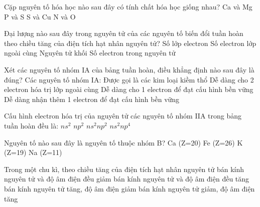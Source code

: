 \documentclass[Main_HOA10.tex]{subfiles}
\begin{document}
\begin{ex}%
	Cặp nguyên tố hóa học nào sau đây có tính chất hóa học giống nhau?
	\choice
	{\True Ca và Mg}
	{P và S}
	{S và Cu}
	{N và O}
\end{ex}
\begin{ex}%
	Đại lượng nào sau đây trong nguyên tử của các nguyên tố biến đổi tuần hoàn theo chiều tăng của điện tích hạt nhân nguyên tử?
	\choice
	{Số lớp electron}
	{\True Số electron lớp ngoài cùng}
	{Nguyên tử khối}
	{Số electron trong nguyên tử}
\end{ex}
\begin{ex}%
	Xét các nguyên tố nhóm IA của bảng tuần hoàn, điều khẳng định nào sau đây là đúng?
	Các nguyên tố nhóm IA:
	\choice
	{Được gọi là các kim loại kiềm thổ}
	{Dễ dàng cho 2 electron hóa trị lớp ngoài cùng}
	{\True Dễ dàng cho 1 electron để đạt cấu hình bền vững}
	{Dễ dàng nhận thêm 1 electron để đạt cấu hình bền vững}
\end{ex}
\begin{ex}%
	Cấu hình electron hóa trị của nguyên tử các nguyên tố nhóm IIA trong bảng tuần hoàn đều là:
	\choice
	{\True $ns^2$}
	{$np^2$}
	{$ns^2np^2$}
	{$ns^2np^4$}
\end{ex}
\begin{ex}%
	Nguyên tố nào sau đây là nguyên tố thuộc nhóm B?
	\choice
	{Ca (Z=20)}
	{\True Fe (Z=26)}
	{K (Z=19)}
	{Na (Z=11)}
\end{ex}
\begin{ex}%
	Trong một chu kì, theo chiều tăng của điện tích hạt nhân nguyên tử
	\choice
	{bán kính nguyên tử và độ âm điện đều giảm}
	{bán kính nguyên tử và độ âm điện đều tăng}
	{bán kính nguyên tử tăng, độ âm điện giảm}
	{\True bán kính nguyên tử giảm, độ âm điện tăng}
\end{ex}
\end{document}
